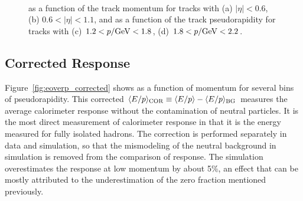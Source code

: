 \begin{figure}[htbp]
{}
~
\caption{\epbg as a function of the track momentum for tracks with (a) $|\eta| < 0.6$, (b) $0.6 < |\eta| < 1.1$, and as a function of the track pseudorapidity for tracks with (c) $1.2 < p / \mathrm{Ge\kern -0.05em V} < 1.8$, (d) $1.8 < p / \mathrm{Ge\kern -0.05em V} < 2.2$.}
\label{fig:eoverp_background}
\end{figure}

\subsection{Corrected Response}
\label{sec:response}

Figure~\ref{fig:eoverp_corrected} shows \epcor as a function of momentum for several bins of pseudorapidity. 
This corrected $\langle E/p \rangle_{\mathrm{COR}} \equiv \langle E/p \rangle - \langle E/p \rangle_{\mathrm{BG}}$ measures the average calorimeter response without the contamination of neutral particles. 
It is the most direct measurement of calorimeter response in that it is the energy measured for fully isolated hadrons. 
The correction is performed separately in data and simulation, so that the mismodeling of the neutral background in simulation is removed from the comparison of response. 
The simulation overestimates the response at low momentum by about 5\%, an effect that can be mostly attributed to the underestimation of the zero fraction mentioned previously.

